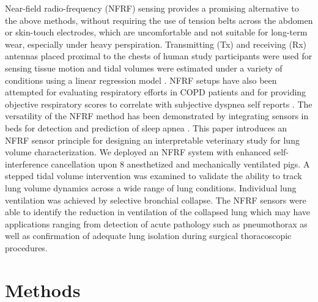 \documentclass[journal,twoside,web]{ieeecolor}
\begin{document}
Near-field radio-frequency (NFRF) sensing provides a promising alternative to the above methods, without requiring the use of tension belts across the abdomen or skin-touch electrodes, which are uncomfortable and not suitable for long-term wear, especially under heavy perspiration. Transmitting (Tx) and receiving (Rx) antennas placed proximal to the chests of human study participants were used for sensing tissue motion and tidal volumes were estimated under a variety of conditions using a linear regression model \cite{sharmaWearableRFSensor2019}\cite{sharmaWearableRadiofrequencySensing2020}. NFRF setups have also been attempted for evaluating respiratory efforts in COPD patients and for providing objective respiratory scores to correlate with subjective dyspnea self reports \cite{zhangFeasibilityStudyUsing2024}\cite{zhangObjectiveScoringPhysiologically2022}. The versatility of the NFRF method has been demonstrated by integrating sensors in beds for detection and prediction of sleep apnea \cite{zhangFurnitureIntegratedRespirationSensors2021}.  This paper introduces an NFRF sensor principle for designing an interpretable veterinary study for lung volume characterization. We deployed an NFRF system with enhanced self-interference cancellation upon 8 anesthetized and mechanically ventilated pigs. A stepped tidal volume intervention was examined to validate the ability to track lung volume dynamics across a wide range of lung conditions. Individual lung ventilation was achieved by selective bronchial collapse. The NFRF sensors were able to identify the reduction in ventilation of the collapsed lung which may have applications ranging from detection of acute pathology such as pneumothorax as well as confirmation of adequate lung isolation during surgical thoracoscopic procedures.
\section{Methods}
\end{document}
